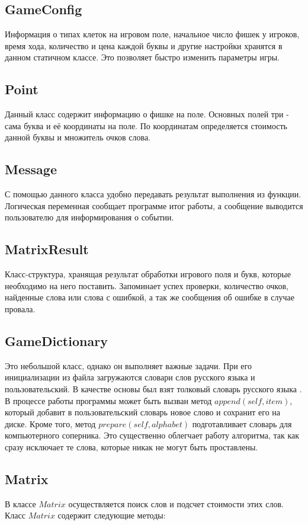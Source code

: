 \documentclass[a4paper,14pt]{article}
\begin{document}
	\subsection{GameConfig}
	Информация о типах клеток на игровом поле, начальное число фишек у игроков, время хода, количество и цена каждой буквы и другие настройки хранятся в данном статичном классе.
	Это позволяет быстро изменить параметры игры.
	
	\subsection{Point}
	Данный класс содержит информацию о фишке на поле.
	Основных полей три - сама буква и её координаты на поле.
	По координатам определяется стоимость данной буквы и множитель очков слова.
	
	\subsection{Message}
	С помощью данного класса удобно передавать результат выполнения из функции.
	Логическая переменная сообщает программе итог работы, а сообщение выводится пользователю для информирования о событии.
	
	\subsection{MatrixResult}
	Класс-структура, хранящая результат обработки игрового поля и букв, которые необходимо на него поставить.
	Запоминает успех проверки, количество очков, найденные слова или слова с ошибкой, а так же сообщения об ошибке в случае провала.
		
	\subsection{GameDictionary}
	Это небольшой класс, однако он выполняет важные задачи.
	При его инициализации из файла загружаются словари слов русского языка и пользовательский.
	В качестве основы был взят толковый словарь русского языка \cite{dictionary}.
	В процессе работы программы может быть вызван метод $append(self, item)$, который добавит в пользовательский словарь новое слово и сохранит его на диске.
	Кроме того, метод $prepare(self, alphabet)$ подготавливает словарь для компьютерного соперника.
	Это существенно облегчает работу алгоритма, так как сразу исключает те слова, которые никак не могут быть проставлены.
	
	\subsection{Matrix}
	В классе $Matrix$ осуществляется поиск слов и подсчет стоимости этих слов. Класс $Matrix$ содержит следующие методы: 
	
\end{document}
